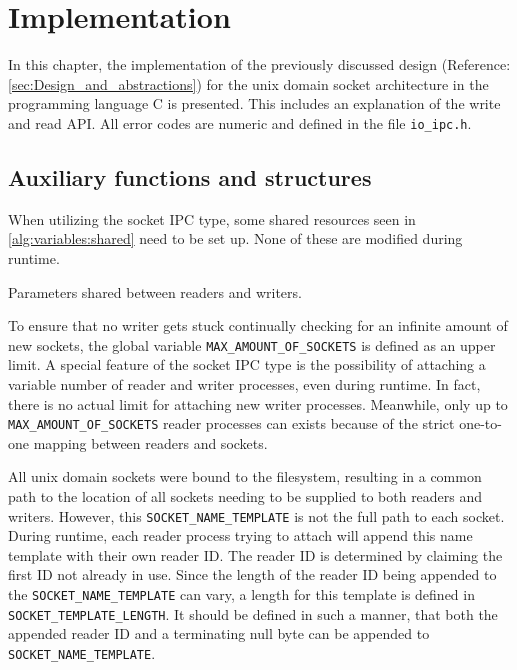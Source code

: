 %
%

\chapter{Implementation}
\label{cha:implementation}
In this chapter, the implementation of the previously discussed design (Reference\@: \ref{sec:Design_and_abstractions}) for the unix domain socket architecture in the programming language C is presented.
This includes an explanation of the write and read \ac{API}.
All error codes are numeric and defined in the file \texttt{io\_ipc.h}.

\section{Auxiliary functions and structures}
When utilizing the socket \ac{IPC} type, some shared resources seen in \ref{alg:variables:shared} need to be set up.
None of these are modified during runtime.

\begin{algorithm}[h!]
    
    \caption[Socket: Shared variables]{Parameters shared between readers and writers.}
    \label{alg:variables:shared}
\end{algorithm}

To ensure that no writer gets stuck continually checking for an infinite amount of new sockets, the global variable \texttt{MAX\_AMOUNT\_OF\_SOCKETS} is defined as an upper limit.
A special feature of the socket \ac{IPC} type is the possibility of attaching a variable number of reader and writer processes, even during runtime.
In fact, there is no actual limit for attaching new writer processes.
Meanwhile, only up to \texttt{MAX\_AMOUNT\_OF\_SOCKETS} reader processes can exists because of the strict one-to-one mapping between readers and sockets. 

All unix domain sockets were bound to the filesystem, resulting in a common path to the location of all sockets needing to be supplied to both readers and writers.
However, this \texttt{SOCKET\_NAME\_TEMPLATE} is not the full path to each socket.
During runtime, each reader process trying to attach will append this name template with their own reader \ac{ID}.
The reader \ac{ID} is determined by claiming the first \ac{ID} not already in use.
Since the length of the reader \ac{ID} being appended to the \texttt{SOCKET\_NAME\_TEMPLATE} can vary, a length for this template is defined in \texttt{SOCKET\_TEMPLATE\_LENGTH}.
It should be defined in such a manner, that both the appended reader \ac{ID} and a terminating null byte can be appended to \texttt{SOCKET\_NAME\_TEMPLATE}.

